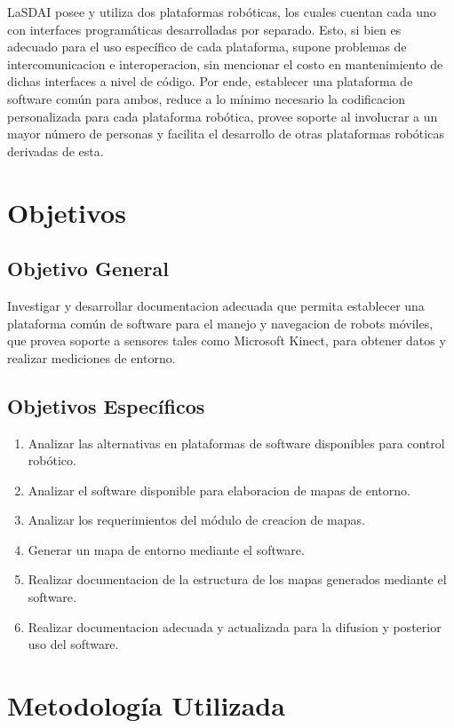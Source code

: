 LaSDAI posee y utiliza dos plataformas robóticas, los cuales cuentan cada uno con interfaces programáticas desarrolladas por separado. Esto, si bien es adecuado para el uso específico de cada plataforma, supone problemas de intercomunicacion e interoperacion, sin mencionar el costo en mantenimiento de dichas interfaces a nivel de código. Por ende, establecer una plataforma de software común para ambos, reduce a lo mínimo necesario la codificacion personalizada para cada plataforma robótica, provee soporte al involucrar a un mayor número de personas y facilita el desarrollo de otras plataformas robóticas derivadas de esta.

\section{Objetivos}

\subsection{Objetivo General}

Investigar y desarrollar documentacion adecuada que permita establecer una plataforma común de software para el manejo y navegacion de robots móviles, que provea soporte a sensores tales como Microsoft Kinect, para obtener datos y realizar mediciones de entorno.

\subsection{Objetivos Específicos}

\begin{enumerate}
	\itemsep1pt \parskip1pt 
	\item Analizar las alternativas en plataformas de software disponibles para control robótico.
	\item Analizar el software disponible para elaboracion de mapas de entorno.
	\item Analizar los requerimientos del módulo de creacion de mapas.
	\item Generar un mapa de entorno mediante el software.
	\item Realizar documentacion de la estructura de los mapas generados mediante el software.
	\item Realizar documentacion adecuada y actualizada para la difusion y posterior uso del software.
\end{enumerate}

\section{Metodología Utilizada}

